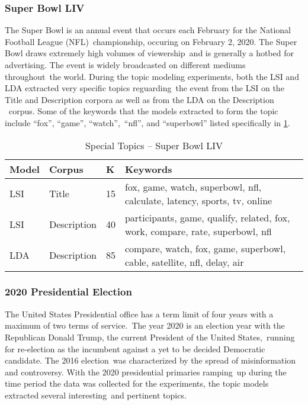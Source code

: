 \documentclass[letterpaper,12pt]{article}
\begin{document}
\subsubsection{Super Bowl LIV}
The Super Bowl is an annual event that occurs each February for the National Football League (NFL)\
championship, occuring on February 2, 2020. The Super Bowl draws extremely high volumes of viewership\
and is generally a hotbed for advertising. The event is widely broadcasted on different mediums throughout\
the world. 
During the topic modeling experiments, both the LSI and LDA extracted very specific topics reguarding\
the event from the LSI on the Title and Description corpora as well as from the LDA on the Description \
corpus. Some of the keywords that the models extracted to form the topic include ``fox'', ``game'', ``watch'',\
``nfl'', and ``superbowl'' listed specifically in \ref{tab:super_bowl}.
\begin{table}
	\caption{\label{tab:super_bowl} Special Topics -- Super Bowl LIV}
	\begin{center}
	\begin{tabular}{|l|l|l|p{11cm}|}
		\hline
		\textbf{Model} &       \textbf{Corpus} &   \textbf{K} &                                                                        \textbf{Keywords} \\
		\hline
			LSI &        Title &  15 &        fox, game, watch, superbowl, nfl, calculate, latency, sports, tv, online \\
			\hline
			LSI &  Description &  40 &  participants, game, qualify, related, fox, work, compare, rate, superbowl, nfl \\
			\hline
			LDA &  Description &  85 &         compare, watch, fox, game, superbowl, cable, satellite, nfl, delay, air \\
		\hline
		\end{tabular}
	\end{center}
\end{table}
\newpage

\subsubsection{2020 Presidential Election}
The United States Presidential office has a term limit of four years with a maximum of two terms of service.\
The year 2020 is an election year with the Republican Donald Trump, the current President of the United States,\
running for re-election as the incumbent against a yet to be decided Democratic candidate. The 2016 election\
was characterized by the spread of misinformation and controversy. With the 2020 presidential primaries ramping\
up during the time period the data was collected for the experiments, the topic models extracted several interesting\
and pertinent topics.
\end{document}
